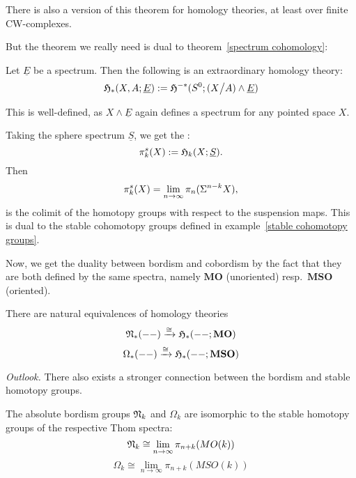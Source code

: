 \documentclass[a4paper,11pt]{article}
\begin{document}
\begin{remark}
    There is also a version of this theorem for homology theories, at least over finite CW-complexes.
\end{remark}

But the theorem we really need is dual to theorem\ \ref{spectrum cohomology}:
\begin{theodef}
    Let \(\underline{E}\) be a spectrum. Then the following is an extraordinary homology theory:
    \[\mathfrak{H}_\ast(X,A;\underline{E}):=\mathfrak{H}^{-\ast}(S^0;(X\big/A)\land \underline{E})\]
\end{theodef}


\begin{remark}
    This is well-defined, as \(X\land\underline{E}\) again defines a spectrum for any pointed space \(X\).
\end{remark}

\begin{example}
    Taking the sphere spectrum \(\underline{S}\), we get the :
    \[\pi^s_k(X):=\mathfrak{H}_k(X;\underline{S}).\]
    Then
    \[\pi^s_k(X)=\lim_{n\to\infty}\pi_n(\Sigma^{n-k}X),\]
    is the colimit of the homotopy groups with respect to the suspension maps.\linebreak
    This is dual to the stable cohomotopy groups defined in example\ \ref{stable cohomotopy groups}.
\end{example}

Now, we get the duality between bordism and cobordism by the fact that they are both defined by the same spectra, namely \(\mathbf{MO}\) (unoriented) resp.\ \(\mathbf{MSO}\) (oriented).

\begin{theorem}
    There are natural equivalences of homology theories
    \[\mathfrak{N}_\ast(--)\xrightarrow{\cong}\mathfrak{H}_\ast(--;\mathbf{MO})\]
    \[\Omega_\ast(--)\xrightarrow{\cong}\mathfrak{H}_\ast(--;\mathbf{MSO})\]
\end{theorem}


\noindent\textit{Outlook.} There also exists a stronger connection between the bordism and stable homotopy groups.
\begin{theorem}
    The absolute bordism groups \(\mathfrak{N}_k\) and \(\Omega_k\) are isomorphic to the stable homotopy groups of the respective Thom spectra:
    \[\mathfrak{N}_k\cong\lim_{n\to\infty}\pi_{n+k}(MO(k))\]
    \[\Omega_k\cong\lim_{n\to\infty}\pi_{n+k}(MSO(k))\]
\end{theorem}
\end{document}
